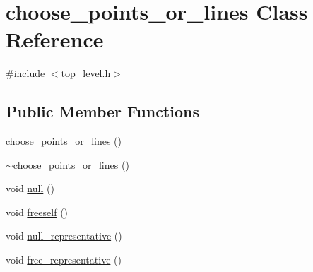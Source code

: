 \hypertarget{classchoose__points__or__lines}{}\section{choose\+\_\+points\+\_\+or\+\_\+lines Class Reference}
\label{classchoose__points__or__lines}


{\ttfamily \#include $<$top\+\_\+level.\+h$>$}

\subsection*{Public Member Functions}
\begin{DoxyCompactItemize}
\item 
\mbox{\hyperlink{classchoose__points__or__lines_a828a78cf68517b36fb8217933d6d8d0c}{choose\+\_\+points\+\_\+or\+\_\+lines}} ()
\item 
\mbox{\hyperlink{classchoose__points__or__lines_a4065c741379ae9de19c1fb9c593a0404}{$\sim$choose\+\_\+points\+\_\+or\+\_\+lines}} ()
\item 
void \mbox{\hyperlink{classchoose__points__or__lines_a1ab9aa07986516d121d8241ea9ae92f4}{null}} ()
\item 
void \mbox{\hyperlink{classchoose__points__or__lines_a9322a375bcb2fcc7b5c675b7dec14188}{freeself}} ()
\item 
void \mbox{\hyperlink{classchoose__points__or__lines_a6dd8867f938f939e4a674cdb71a8e9fd}{null\+\_\+representative}} ()
\item 
void \mbox{\hyperlink{classchoose__points__or__lines_aec134389294ee5afc437244fe57a5995}{free\+\_\+representative}} ()
\item 

\end{DoxyCompactItemize}
